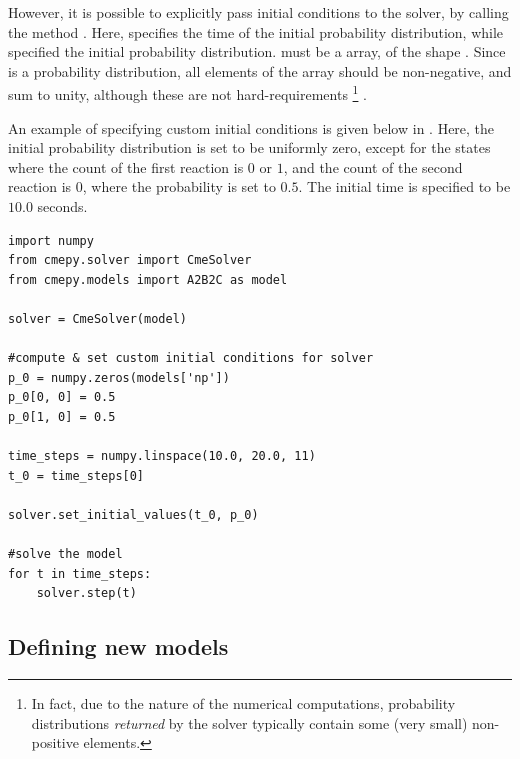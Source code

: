 However, it is possible to explicitly pass initial conditions to the solver,
by calling the method . Here, 
specifies the time of the initial probability distribution, while 
specified the initial probability distribution.  must be a \numpy{}
array, of the shape . Since 
is a probability distribution, all elements of the array should be non-negative,
and sum to unity, although these are not hard-requirements
\footnote
{
	In fact, due to the nature of the numerical computations, probability
	distributions \emph{returned} by the solver typically contain some
	(very small) non-positive elements.
}
.

An example of specifying custom initial conditions is given below in
.
Here, the initial probability distribution is set to be uniformly zero,
except for the states where the count of the first
reaction is $0$ or $1$, and the count of the second reaction is $0$, where the
probability is set to $0.5$. The initial time is specified to be $10.0$ seconds.

\begin{lstlisting}[frame=tb,
caption={Example: specifying initial conditions},
label=solverSetInitialValues
]
import numpy
from cmepy.solver import CmeSolver
from cmepy.models import A2B2C as model

solver = CmeSolver(model)

#compute & set custom initial conditions for solver
p_0 = numpy.zeros(models['np'])
p_0[0, 0] = 0.5
p_0[1, 0] = 0.5

time_steps = numpy.linspace(10.0, 20.0, 11)
t_0 = time_steps[0]

solver.set_initial_values(t_0, p_0)

#solve the model
for t in time_steps:
	solver.step(t)
\end{lstlisting}

\subsection{Defining new models}
\label{subsectionModels}



